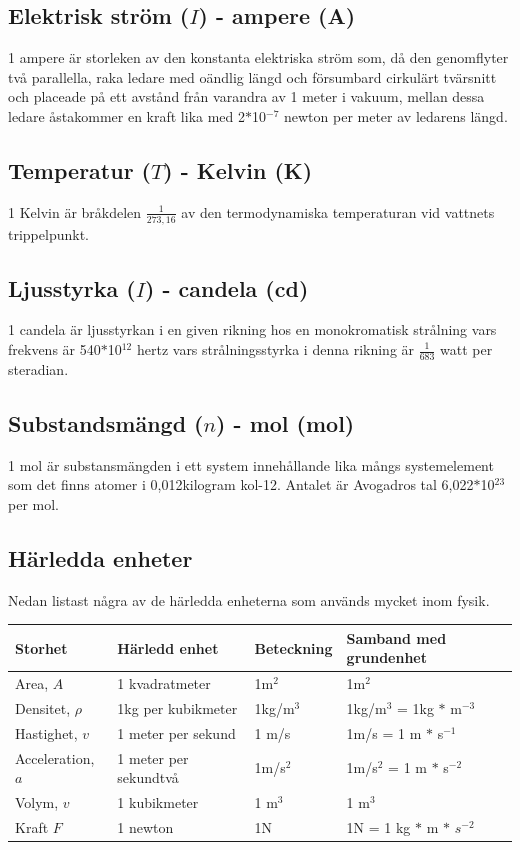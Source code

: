 \documentclass[a4paper,11pt]{article}
\begin{document}
\begin{flushleft}
\subsection{Elektrisk ström ($I$) - ampere (A)}
1 ampere är storleken av den konstanta elektriska ström som, då den genomflyter två parallella, raka ledare med oändlig längd och försumbard cirkulärt tvärsnitt och placeade på ett avstånd från varandra av 1 meter i vakuum, mellan dessa ledare åstakommer en kraft lika med 2$*$10$^{-7}$ newton per meter av ledarens längd.

\subsection{Temperatur ($T$) - Kelvin (K)}
1 Kelvin är bråkdelen $\frac{1}{273,16}$ av den termodynamiska temperaturan vid vattnets trippelpunkt.

\subsection{Ljusstyrka ($I$) - candela (cd)}
1 candela är ljusstyrkan i en given rikning hos en monokromatisk strålning vars frekvens är 540$*$10$^{12}$ hertz vars strålningsstyrka i denna rikning är $\frac{1}{683}$ watt per steradian.

\subsection{Substandsmängd ($n$) - mol (mol)}
1 mol är substansmängden i ett system innehållande lika mångs systemelement som det finns atomer i 0,012kilogram kol-12. Antalet är Avogadros tal 6,022$*$10$^{23}$ per mol.

\subsection{Härledda enheter}
Nedan listast några av de härledda enheterna som används mycket inom fysik.
\begin{tabular}{llll}
Storhet & Härledd enhet & Beteckning & Samband med grundenhet \\\hline
Area, $A$ & 1 kvadratmeter & 1m$^2$ & 1m$^2$ \\\hline
Densitet, $\rho$ & 1kg per kubikmeter & 1kg/m$^3$ & 1kg/m$^3$ = 1kg $*$ m$^{-3}$ \\\hline
Hastighet, $v$ & 1 meter per sekund & 1 m/s & 1m/s = 1 m $*$ s$^{-1}$ \\ \hline
Acceleration, $a$& 1 meter per sekundtvå & 1m/s$^2$ & 1m/s$^2$ = 1 m $*$ s$^{-2}$ \\ \hline
Volym, $v$ & 1 kubikmeter & 1 m$^3 $ & 1 m$^3 $ \\ \hline
Kraft $F$ & 1 newton & 1N & 1N = 1 kg $*$ m $*$ $s^{-2}$
\end{tabular}
\newpage

\end{flushleft}
\end{document}
